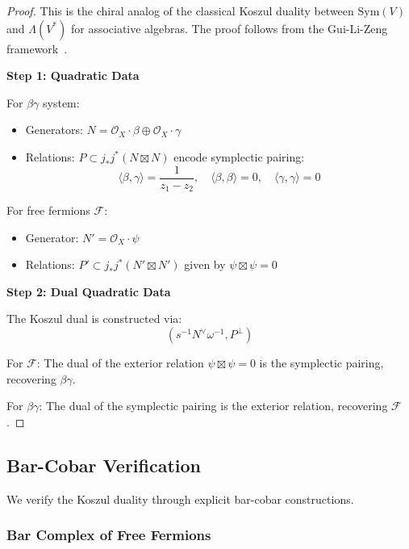 \begin{proof}
This is the chiral analog of the classical Koszul duality between $\text{Sym}(V)$ and $\Lambda(V^*)$ 
for associative algebras. The proof follows from the Gui-Li-Zeng framework~\cite{GLZ-2212.11252v1}.

\textbf{Step 1: Quadratic Data}

For $\beta\gamma$ system:
\begin{itemize}
\item Generators: $N = \mathcal{O}_X \cdot \beta \oplus \mathcal{O}_X \cdot \gamma$
\item Relations: $P \subset j_* j^*(N \boxtimes N)$ encode symplectic pairing:
$$\langle \beta, \gamma \rangle = \frac{1}{z_1 - z_2}, \quad \langle \beta, \beta \rangle = 0, \quad \langle \gamma, \gamma \rangle = 0$$
\end{itemize}

For free fermions $\mathcal{F}$:
\begin{itemize}
\item Generator: $N' = \mathcal{O}_X \cdot \psi$  
\item Relations: $P' \subset j_* j^*(N' \boxtimes N')$ given by $\psi \boxtimes \psi = 0$
\end{itemize}

\textbf{Step 2: Dual Quadratic Data}

The Koszul dual is constructed via:
$$(s^{-1}N^{\vee}\omega^{-1}, P^{\perp})$$

For $\mathcal{F}$: The dual of the exterior relation $\psi \boxtimes \psi = 0$ is the symplectic pairing, 
recovering $\beta\gamma$.

For $\beta\gamma$: The dual of the symplectic pairing is the exterior relation, recovering $\mathcal{F}$.
\end{proof}

\subsection{Bar-Cobar Verification}
\label{subsec:bar-cobar-verification}

We verify the Koszul duality through explicit bar-cobar constructions.

\subsubsection{Bar Complex of Free Fermions}

